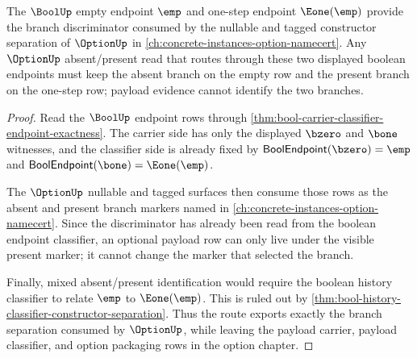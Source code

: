 \begin{theorem}
\label{thm:bool-option-constructor-disjointness-route}
The $\BoolUp$ empty endpoint $\emp$ and one-step endpoint $\Eone(\emp)$ provide
the branch discriminator consumed by the nullable and tagged constructor
separation of $\OptionUp$ in \autoref{ch:concrete-instances-option-namecert}.
Any $\OptionUp$ absent/present read that routes through these two displayed
boolean endpoints must keep the absent branch on the empty row and the present
branch on the one-step row; payload evidence cannot identify the two branches.
\end{theorem}
\begin{proof}
Read the $\BoolUp$ endpoint rows through
\autoref{thm:bool-carrier-classifier-endpoint-exactness}. The carrier side has
only the displayed $\bzero$ and $\bone$ witnesses, and the classifier side is
already fixed by $\mathsf{BoolEndpoint}(\bzero)=\emp$ and
$\mathsf{BoolEndpoint}(\bone)=\Eone(\emp)$.

The $\OptionUp$ nullable and tagged surfaces then consume those rows as the
absent and present branch markers named in
\autoref{ch:concrete-instances-option-namecert}. Since the discriminator has
already been read from the boolean endpoint classifier, an optional payload row
can only live under the visible present marker; it cannot change the marker that
selected the branch.

Finally, mixed absent/present identification would require the boolean history
classifier to relate $\emp$ to $\Eone(\emp)$. This is ruled out by
\autoref{thm:bool-history-classifier-constructor-separation}. Thus the route
exports exactly the branch separation consumed by $\OptionUp$, while leaving the
payload carrier, payload classifier, and option packaging rows in the option
chapter.
\end{proof}

